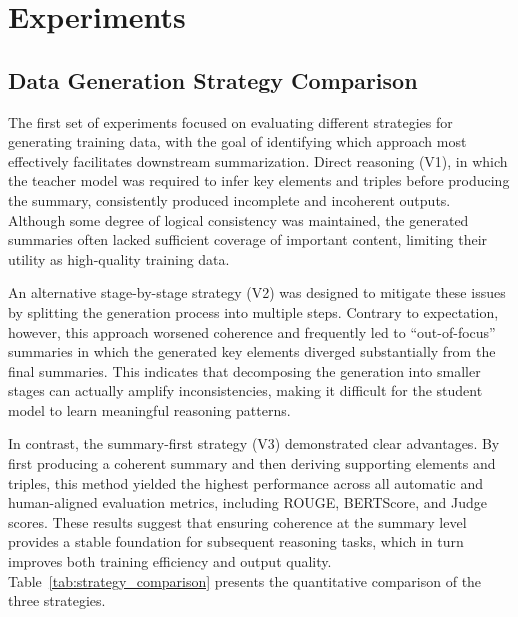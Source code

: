 
\setlength{\parindent}{0em}
\chapter{Experiments}
\section{Data Generation Strategy Comparison}
The first set of experiments focused on evaluating different strategies for generating training data, with the goal of identifying which approach most effectively facilitates downstream summarization. Direct reasoning (V1), in which the teacher model was required to infer key elements and triples before producing the summary, consistently produced incomplete and incoherent outputs. Although some degree of logical consistency was maintained, the generated summaries often lacked sufficient coverage of important content, limiting their utility as high-quality training data.

An alternative stage-by-stage strategy (V2) was designed to mitigate these issues by splitting the generation process into multiple steps. Contrary to expectation, however, this approach worsened coherence and frequently led to “out-of-focus” summaries in which the generated key elements diverged substantially from the final summaries. This indicates that decomposing the generation into smaller stages can actually amplify inconsistencies, making it difficult for the student model to learn meaningful reasoning patterns.

In contrast, the summary-first strategy (V3) demonstrated clear advantages. By first producing a coherent summary and then deriving supporting elements and triples, this method yielded the highest performance across all automatic and human-aligned evaluation metrics, including ROUGE, BERTScore, and Judge scores. These results suggest that ensuring coherence at the summary level provides a stable foundation for subsequent reasoning tasks, which in turn improves both training efficiency and output quality. Table~\ref{tab:strategy_comparison} presents the quantitative comparison of the three strategies.

\begin{center}
    \label{tab:strategy_comparison}
\end{center}

